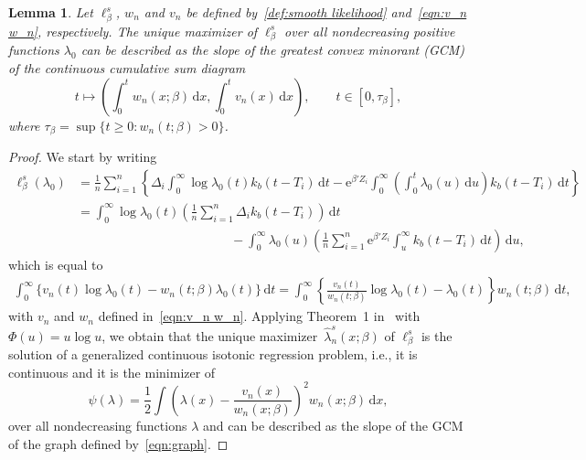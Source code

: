 \documentclass[11pt,reqno]{amsart}
\theoremstyle{definition}
\theoremstyle{plain}
\newtheorem{lemma}[de]{Lemma}
\theoremstyle{remark}
\begin{document}
\begin{lemma}
\label{lem:char MSLE}
Let $\ell^s_\beta$, $w_n$ and $v_n$ be defined by~\eqref{def:smooth likelihood} and~\eqref{eqn:v_n w_n}, respectively.
The unique maximizer of $\ell^s_\beta$ over all nondecreasing positive functions $\lambda_0$ can be described as the slope of the greatest convex minorant (GCM)
of the continuous cumulative sum diagram
\begin{equation}
\label{eqn:graph}
t\mapsto \left(\int_0^t w_n(x;\beta)\,\mathrm{d}x, \int_0^t v_n(x)\,\mathrm{d}x\right),
\qquad t\in[0,\tau_\beta],
\end{equation}
where $\tau_\beta
=
\sup\{t\geq 0:w_n(t;\beta)>0\}$.
\end{lemma}
\begin{proof}
We start by writing
\[
\begin{split}
\ell^s_\beta(\lambda_0)
&=
\frac{1}{n}\sum_{i=1}^n
\left\{
\Delta_i\int_0^\infty\log \lambda_0(t)k_b(t-T_i)\,\mathrm{d}t
-
\mathrm{e}^{\beta'Z_i}\int_0^\infty
\left(
\int_0^t \lambda_0(u)\,\mathrm{d}u
\right)k_b(t-T_i)
\,\mathrm{d}t\right\}\\
&=
\int_0^\infty\log \lambda_0(t)
\left( \frac{1}{n}\sum_{i=1}^n \Delta_i
k_b(t-T_i)\right)\,\mathrm{d}t\\
&\qquad\qquad\qquad\qquad\qquad\qquad-
\int_0^\infty
\lambda_0(u)
\left(\frac{1}{n}\sum_{i=1}^n\mathrm{e}^{\beta'Z_i}
\int_{u}^\infty k_b(t-T_i)\,\mathrm{d}t\right)\,\mathrm{d}u,
\end{split}
\]
which is equal to
\[
\begin{split}
\int_0^\infty
\Big\{
v_n(t)\log\lambda_0(t)-w_n(t;\beta)\lambda_0(t)
\Big\}\,\mathrm{d}t
=
\int_0^\infty
\left\{
\frac{v_n(t)}{w_n(t;\beta)}\log\lambda_0(t)-\lambda_0(t)
\right\}w_n(t;\beta)\,\mathrm{d}t,
\end{split}
\]
with $v_n$ and $w_n$ defined in~\eqref{eqn:v_n w_n}.
Applying Theorem~1 in~\cite{GJ10} with $\Phi(u)=u\log u$, we obtain
that the unique maximizer~$\hat{\lambda}^s_n(x;\beta)$ of $\ell^s_\beta$ is the solution of a generalized continuous isotonic regression problem, i.e.,
it is continuous and it is the minimizer of
\begin{equation}
\label{eqn:isot.regr}
\psi(\lambda)=\frac{1}{2}\int \left(\lambda(x)-\frac{v_n(x)}{w_n(x;\beta)}\right)^2
w_n(x;\beta)\,\mathrm{d}x,
\end{equation}
over all nondecreasing functions $\lambda$ and can be described as the slope of the GCM of the graph defined by~\eqref{eqn:graph}.
\end{proof}
\end{document}

